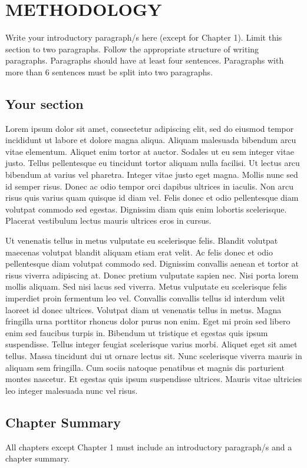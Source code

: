 \setlength{\parindent}{0.5in} 
\setlength{\parskip}{0mm}
\setlength{\baselineskip}{1.6em}

\chapter{METHODOLOGY}
\label{ch:methodology}
Write your introductory paragraph/s here (except for Chapter 1). Limit this section to two paragraphs. Follow the appropriate structure of writing paragraphs. Paragraphs should have at least four sentences. Paragraphs with more than 6 sentences must be split into two paragraphs.

\section{Your section}
Lorem ipsum dolor sit amet, consectetur adipiscing elit, sed do eiusmod tempor incididunt ut labore et dolore magna aliqua. Aliquam malesuada bibendum arcu vitae elementum. Aliquet enim tortor at auctor. Sodales ut eu sem integer vitae justo. Tellus pellentesque eu tincidunt tortor aliquam nulla facilisi. Ut lectus arcu bibendum at varius vel pharetra. Integer vitae justo eget magna. Mollis nunc sed id semper risus. Donec ac odio tempor orci dapibus ultrices in iaculis. Non arcu risus quis varius quam quisque id diam vel. Felis donec et odio pellentesque diam volutpat commodo sed egestas. Dignissim diam quis enim lobortis scelerisque. Placerat vestibulum lectus mauris ultrices eros in cursus.

Ut venenatis tellus in metus vulputate eu scelerisque felis. Blandit volutpat maecenas volutpat blandit aliquam etiam erat velit. Ac felis donec et odio pellentesque diam volutpat commodo sed. Dignissim convallis aenean et tortor at risus viverra adipiscing at. Donec pretium vulputate sapien nec. Nisi porta lorem mollis aliquam. Sed nisi lacus sed viverra. Metus vulputate eu scelerisque felis imperdiet proin fermentum leo vel. Convallis convallis tellus id interdum velit laoreet id donec ultrices. Volutpat diam ut venenatis tellus in metus. Magna fringilla urna porttitor rhoncus dolor purus non enim. Eget mi proin sed libero enim sed faucibus turpis in. Bibendum ut tristique et egestas quis ipsum suspendisse. Tellus integer feugiat scelerisque varius morbi. Aliquet eget sit amet tellus. Massa tincidunt dui ut ornare lectus sit. Nunc scelerisque viverra mauris in aliquam sem fringilla. Cum sociis natoque penatibus et magnis dis parturient montes nascetur. Et egestas quis ipsum suspendisse ultrices. Mauris vitae ultricies leo integer malesuada nunc vel risus.

\section{Chapter Summary}
All chapters except Chapter 1 must include an introductory paragraph/s and a chapter summary.

\FloatBarrier